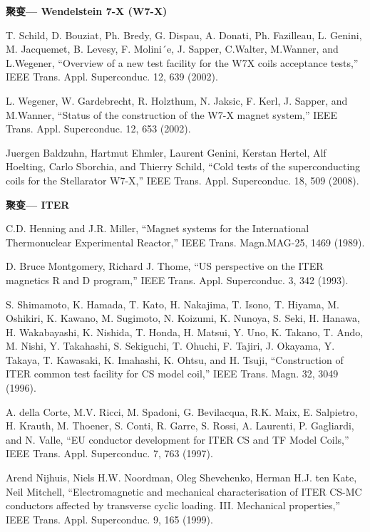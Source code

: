 \noindent \textbf{聚变--- Wendelstein 7-X (W7-X) }

\noindent [9.39] T. Schild, D. Bouziat, Ph. Bredy, G. Dispau, A. Donati, Ph. Fazilleau, L. Genini,
M. Jacquemet, B. Levesy, F. Molini´e, J. Sapper, C.Walter, M.Wanner, and L.Wegener,
``Overview of a new test facility for the W7X coils acceptance tests,” IEEE
Trans. Appl. Superconduc. 12, 639 (2002).

\noindent [9.40] L. Wegener, W. Gardebrecht, R. Holzthum, N. Jaksic, F. Kerl, J. Sapper, and
M.Wanner, ``Status of the construction of the W7-X magnet system,” IEEE Trans.
Appl. Superconduc. 12, 653 (2002).

\noindent [9.41] Juergen Baldzuhn, Hartmut Ehmler, Laurent Genini, Kerstan Hertel, Alf Hoelting,
Carlo Sborchia, and Thierry Schild, ``Cold tests of the superconducting coils for
the Stellarator W7-X,” IEEE Trans. Appl. Superconduc. 18, 509 (2008).

\noindent \textbf{聚变--- ITER }

\noindent [9.42] C.D. Henning and J.R. Miller, ``Magnet systems for the International Thermonuclear Experimental Reactor,” IEEE Trans. Magn.MAG-25, 1469 (1989).

\noindent [9.43] D. Bruce Montgomery, Richard J. Thome, ``US perspective on the ITER magnetics R and D program,” IEEE Trans. Appl. Superconduc. 3, 342 (1993).

\noindent [9.44] S. Shimamoto, K. Hamada, T. Kato, H. Nakajima, T. Isono, T. Hiyama, M. Oshikiri,
K. Kawano, M. Sugimoto, N. Koizumi, K. Nunoya, S. Seki, H. Hanawa,
H. Wakabayashi, K. Nishida, T. Honda, H. Matsui, Y. Uno, K. Takano, T. Ando,
M. Nishi, Y. Takahashi, S. Sekiguchi, T. Ohuchi, F. Tajiri, J. Okayama, Y. Takaya,
T. Kawasaki, K. Imahashi, K. Ohtsu, and H. Tsuji, ``Construction of ITER common
test facility for CS model coil,” IEEE Trans. Magn. 32, 3049 (1996).

\noindent [9.45] A. della Corte, M.V. Ricci, M. Spadoni, G. Bevilacqua, R.K. Maix, E. Salpietro,
H. Krauth, M. Thoener, S. Conti, R. Garre, S. Rossi, A. Laurenti, P. Gagliardi,
and N. Valle, ``EU conductor development for ITER CS and TF Model Coils,”
IEEE Trans. Appl. Superconduc. 7, 763 (1997).

\noindent [9.46] Arend Nijhuis, Niels H.W. Noordman, Oleg Shevchenko, Herman H.J. ten Kate,
Neil Mitchell, ``Electromagnetic and mechanical characterisation of ITER CS-MC
conductors affected by transverse cyclic loading. III. Mechanical properties,” IEEE
Trans. Appl. Superconduc. 9, 165 (1999).

